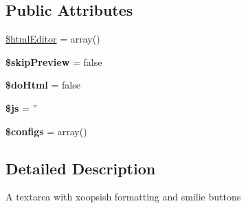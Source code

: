 \subsection*{Public Attributes}
\begin{DoxyCompactItemize}
\item 
\hyperlink{class_xoops_form_dhtml_text_area_a1f790793d4aaae687eb83758ab477799}{\$html\-Editor} = array()
\item 
\hypertarget{class_xoops_form_dhtml_text_area_a850029e4d5cd2e61c64469012bfceab8}{{\bfseries \$skip\-Preview} = false}\label{class_xoops_form_dhtml_text_area_a850029e4d5cd2e61c64469012bfceab8}

\item 
\hypertarget{class_xoops_form_dhtml_text_area_a4c5317294ece32a3909105c254bc8b88}{{\bfseries \$do\-Html} = false}\label{class_xoops_form_dhtml_text_area_a4c5317294ece32a3909105c254bc8b88}

\item 
\hypertarget{class_xoops_form_dhtml_text_area_aaad714991a3c55de4922462217ab2b21}{{\bfseries \$js} = ''}\label{class_xoops_form_dhtml_text_area_aaad714991a3c55de4922462217ab2b21}

\item 
\hypertarget{class_xoops_form_dhtml_text_area_aa1ded78eb40e89043e1addc51298c159}{{\bfseries \$configs} = array()}\label{class_xoops_form_dhtml_text_area_aa1ded78eb40e89043e1addc51298c159}

\end{DoxyCompactItemize}


\subsection{Detailed Description}
A textarea with xoopsish formatting and smilie buttons 

